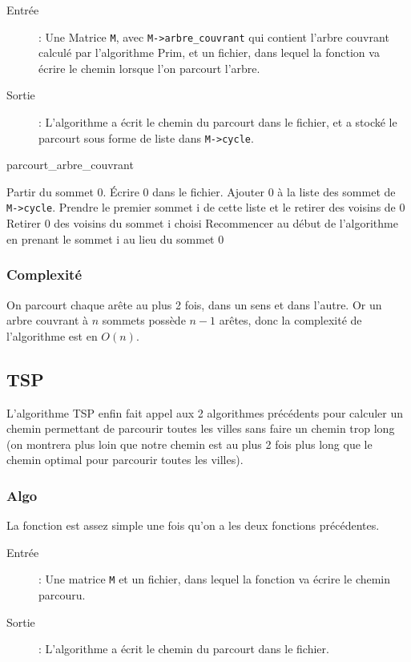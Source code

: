 \documentclass[a4paper,11pt]{article}
\begin{document}
\begin{description}
\item[Entrée] : Une \textsf{Matrice} \texttt{M}, avec \texttt{M->arbre\_couvrant} qui contient l'arbre couvrant calculé par l'algorithme Prim, et un fichier, dans lequel la fonction va écrire le chemin lorsque l'on parcourt l'arbre.
\item[Sortie] : L'algorithme a écrit le chemin du parcourt dans le fichier, et a stocké le parcourt sous forme de liste dans \texttt{M->cycle}.\\
\end{description}

\begin{algorithm}
\caption{parcourt\_arbre\_couvrant}
\begin{algorithmic}[1]

\STATE Partir du sommet 0.
\STATE Écrire 0 dans le fichier.
\STATE Ajouter 0 à la liste des sommet de \texttt{M->cycle}.
\STATE Prendre le premier sommet i de cette liste et le retirer des voisins de 0
\STATE Retirer 0 des voisins du sommet i choisi
\STATE Recommencer au début de l'algorithme en prenant le sommet i au lieu du sommet 0
\ENDWHILE

\end{algorithmic}
\end{algorithm}

\subsubsection*{Complexité}
On parcourt chaque arête au plus 2 fois, dans un sens et dans l'autre. Or un arbre couvrant à $n$ sommets possède $n-1$ arêtes, donc la complexité de l'algorithme est en $O(n)$.

\subsection{TSP}

L'algorithme TSP enfin fait appel aux 2 algorithmes précédents pour calculer un chemin permettant de parcourir toutes les villes sans faire un chemin trop long (on montrera plus loin que notre chemin est au plus 2 fois plus long que le chemin optimal pour parcourir toutes les villes).

\subsubsection*{Algo}
La fonction est assez simple une fois qu'on a les deux fonctions précédentes.
\begin{description}
\item[Entrée] : Une matrice \texttt{M} et un fichier, dans lequel la fonction va écrire le chemin parcouru.
\item[Sortie] : L'algorithme a écrit le chemin du parcourt dans le fichier.\\
\end{description}
\end{document}
